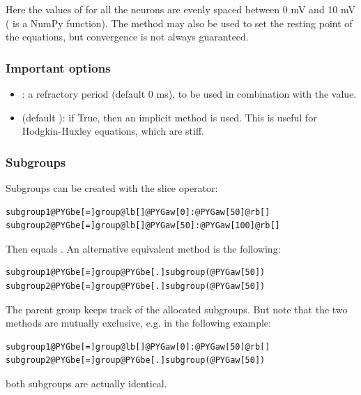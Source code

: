 \documentclass[letterpaper,10pt]{manual}
\begin{document}
Here the values of  for all the neurons are evenly spaced between 0 mV and 10 mV
( is a NumPy function). The method  may also be used to set the
resting point of the equations, but convergence is not always guaranteed.


\subsubsection{Important options}
\begin{itemize}
\item {} 
: a refractory period (default 0 ms), to be used in combination with the  value.

\item {} 
 (default ): if True, then an implicit method is used. This is useful
for Hodgkin-Huxley equations, which are stiff.

\end{itemize}


\subsubsection{Subgroups}

Subgroups can be created with the slice operator:

\begin{Verbatim}[commandchars=@\[\]]
subgroup1@PYGbe[=]group@lb[]@PYGaw[0]:@PYGaw[50]@rb[]
subgroup2@PYGbe[=]group@lb[]@PYGaw[50]:@PYGaw[100]@rb[]
\end{Verbatim}

Then  equals .
An alternative equivalent method is the following:

\begin{Verbatim}[commandchars=@\[\]]
subgroup1@PYGbe[=]group@PYGbe[.]subgroup(@PYGaw[50])
subgroup2@PYGbe[=]group@PYGbe[.]subgroup(@PYGaw[50])
\end{Verbatim}

The parent group keeps track of the allocated subgroups. But note that the two methods are
mutually exclusive, e.g. in the following example:

\begin{Verbatim}[commandchars=@\[\]]
subgroup1@PYGbe[=]group@lb[]@PYGaw[0]:@PYGaw[50]@rb[]
subgroup2@PYGbe[=]group@PYGbe[.]subgroup(@PYGaw[50])
\end{Verbatim}

both subgroups are actually identical.
\end{document}
